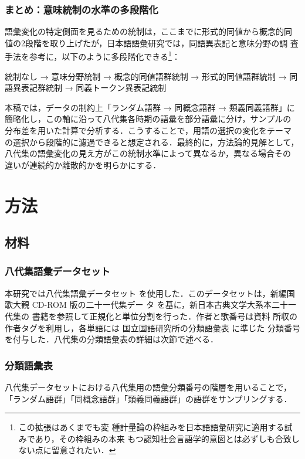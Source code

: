 \documentclass[submit]{ipsj}
\begin{document}
\subsubsection{まとめ：意味統制の水準の多段階化}
\label{sec:org7b7d59a}
語彙変化の特定側面を見るための統制は，ここまでに形式的同値から概念的同
値の2段階を取り上げたが，日本語語彙研究では，同語異表記と意味分野の調
査手法を参考に，以下のように多段階化できる\footnote{この拡張はあくまでも変
種計量論の枠組みを日本語語彙研究に適用する試みであり，その枠組みの本来
もつ認知社会言語学的意図とは必ずしも合致しない点に留意されたい．}：

統制なし → 意味分野統制 → 概念的同値語群統制 → 形式的同値語群統制 → 同
語異表記群統制 → 同義トークン異表記統制

本稿では，データの制約上「ランダム語群 → 同概念語群 → 類義同義語群」に
簡略化し，この軸に沿って八代集各時期の語彙を部分語彙に分け，サンプルの
分布差を用いた計算で分析する．こうすることで，用語の選択の変化をテーマ
の選択から段階的に濾過できると想定される．最終的に，方法論的見解として，
八代集の語彙変化の見え方がこの統制水準によって異なるか，異なる場合その
違いが連続的か離散的かを明らかにする．
\section{方法\label{orge3b8157}}
\label{sec:orgddb1cf3}
\subsection{材料\label{org2d27818}}
\label{sec:orgda97b41}
\subsubsection{八代集語彙データセット\label{org608f41d}}
\label{sec:orgafd9770}
本研究では八代集語彙データセット \cite{Hodoscek2022Developmenta}
を使用した．このデータセットは，新編国歌大観 CD-ROM 版の二十一代集デー
タ\cite{shinhen1996CDROM} を基に，新日本古典文学大系本二十一代集の
書籍を参照して正規化と単位分割を行った．作者と歌番号は資料
\cite{nakamura1999Kokubungaku} 所収の作者タグを利用し，各単語には
国立国語研究所の分類語彙表 \cite{nakano1994Bunruigoihyo} に準じた
分類番号を付与した．八代集の分類語彙表の詳細は次節で述べる．
\subsubsection{分類語彙表\label{orgf9989d3}}
\label{sec:org727fcf1}
八代集データセットにおける八代集用の語彙分類番号の階層を用いることで，
「ランダム語群」「同概念語群」「類義同義語群」の語群をサンプリングする．
\end{document}
